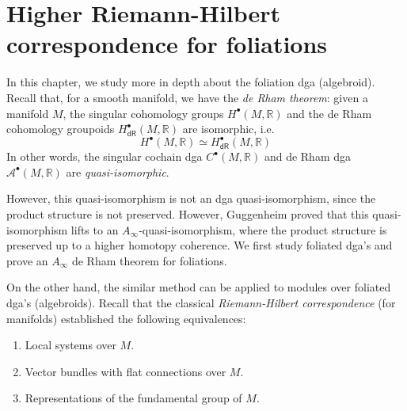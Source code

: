 \documentclass[12pt]{amsart}
\theoremstyle{definition}
\newtheorem{example}[thm]{Example}
\theoremstyle{remark}
\numberwithin{equation}{section}
\newcommand{\R}{{\mathbb{R}}}
\newcommand{\1}{{\mathbb{1}}}
\newcommand{\dr}{\mathsf{dR}}
\newcommand{\bt}{\bullet}
\begin{document}

	

	



\part{Higher Riemann-Hilbert correspondence for foliations}


In this chapter, we study more in depth about the foliation dga (algebroid). Recall that, for a smooth manifold, we have the {\it de Rham theorem}: given a manifold $M$, the singular cohomology groups $H^{\bt}(M, \R)$ and the de Rham cohomology groupoids $H^{\bt}_{\dr}(M, \R)$ are isomorphic, i.e.
\begin{equation*}
    H^{\bt}(M, \R)\simeq H^{\bt}_{\dr}(M, \R)
\end{equation*}
In other words, the singular cochain dga $C^{\bt}(M, \R)$ and de Rham dga $\mathcal{A}^{\bt}(M, \R)$ are {\it quasi-isomorphic}.

However, this quasi-isomorphism is not an dga quasi-isomorphism, since the product structure is not preserved. However, Guggenheim \cite{Gug77} proved that this quasi-isomorphism lifts to an $A_{\infty}$-quasi-isomorphism, where the product structure is preserved up to a higher homotopy coherence. We first study foliated dga's and prove an $A_{\infty}$ de Rham theorem for foliations. 

On the other hand, the similar method can be applied to modules over foliated dga's (algebroids). Recall that the classical {\it Riemann-Hilbert correspondence} (for manifolds) established the following equivalences:
\begin{enumerate}
    \item Local systems over $M$.
    \item Vector bundles with flat connections over $M$.
    \item Representations of the fundamental group of $M$.
\end{enumerate}
\end{document}
